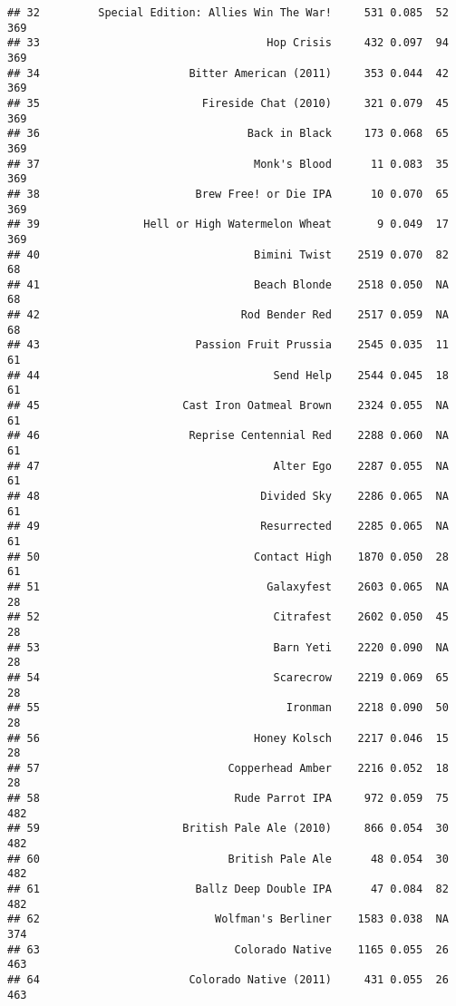 \documentclass[
]{article}
\begin{document}
\begin{verbatim}
## 32         Special Edition: Allies Win The War!     531 0.085  52        369
## 33                                   Hop Crisis     432 0.097  94        369
## 34                       Bitter American (2011)     353 0.044  42        369
## 35                         Fireside Chat (2010)     321 0.079  45        369
## 36                                Back in Black     173 0.068  65        369
## 37                                 Monk's Blood      11 0.083  35        369
## 38                        Brew Free! or Die IPA      10 0.070  65        369
## 39                Hell or High Watermelon Wheat       9 0.049  17        369
## 40                                 Bimini Twist    2519 0.070  82         68
## 41                                 Beach Blonde    2518 0.050  NA         68
## 42                               Rod Bender Red    2517 0.059  NA         68
## 43                        Passion Fruit Prussia    2545 0.035  11         61
## 44                                    Send Help    2544 0.045  18         61
## 45                      Cast Iron Oatmeal Brown    2324 0.055  NA         61
## 46                       Reprise Centennial Red    2288 0.060  NA         61
## 47                                    Alter Ego    2287 0.055  NA         61
## 48                                  Divided Sky    2286 0.065  NA         61
## 49                                  Resurrected    2285 0.065  NA         61
## 50                                 Contact High    1870 0.050  28         61
## 51                                   Galaxyfest    2603 0.065  NA         28
## 52                                    Citrafest    2602 0.050  45         28
## 53                                    Barn Yeti    2220 0.090  NA         28
## 54                                    Scarecrow    2219 0.069  65         28
## 55                                      Ironman    2218 0.090  50         28
## 56                                 Honey Kolsch    2217 0.046  15         28
## 57                             Copperhead Amber    2216 0.052  18         28
## 58                              Rude Parrot IPA     972 0.059  75        482
## 59                      British Pale Ale (2010)     866 0.054  30        482
## 60                             British Pale Ale      48 0.054  30        482
## 61                        Ballz Deep Double IPA      47 0.084  82        482
## 62                           Wolfman's Berliner    1583 0.038  NA        374
## 63                              Colorado Native    1165 0.055  26        463
## 64                       Colorado Native (2011)     431 0.055  26        463

\end{verbatim}
\end{document}
